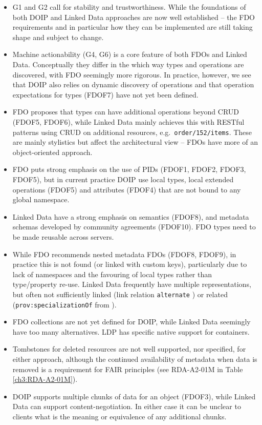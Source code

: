 \begin{itemize}
  \item
    G1 and G2 call for stability and trustworthiness. While the foundations of both DOIP and Linked Data approaches are now well established -- the FDO requirements and in particular how they can be implemented are still taking shape and subject to change.
  \item
    Machine actionability (G4, G6) is a core feature of both FDOs and Linked Data. Conceptually they differ in the which way types and operations are discovered, with FDO seemingly more rigorous. In practice, however, we see that DOIP also relies on dynamic discovery of operations and that operation expectations for types (FDOF7) have not yet been defined.
  \item
    FDO proposes that types can have additional operations beyond CRUD (FDOF5, FDOF6), while Linked Data mainly achieves this with RESTful patterns using CRUD on additional resources, e.g.~\texttt{order/152/items}. These are mainly stylistics but affect the architectural view -- FDOs have more of an object-oriented approach.
  \item
    FDO puts strong emphasis on the use of PIDs (FDOF1, FDOF2, FDOF3, FDOF5), but in current practice DOIP use local types, local extended operations (FDOF5) and attributes (FDOF4) that are not bound to any global namespace.
  \item
    Linked Data have a strong emphasis on semantics (FDOF8), and metadata schemas developed by community agreements (FDOF10). FDO types need to be made reusable across servers.
  \item
    While FDO recommends nested metadata FDOs (FDOF8, FDOF9), in practice this is not found (or linked with custom keys), particularly due to lack of namespaces and the favouring of local types rather than type/property re-use. Linked Data frequently have multiple representations, but often not sufficiently linked (link relation \texttt{alternate} \cite{rfc8288}) or related (\texttt{prov:specializationOf} from \cite{w3-prov-o}).
  \item
    FDO collections are not yet defined for DOIP, while Linked Data seemingly have too many alternatives. LDP has specific native support for containers.
  \item
    Tombstones for deleted resources are not well supported, nor specified, for either approach, although the continued availability of metadata when data is removed is a requirement for FAIR principles (see RDA-A2-01M in Table \vref{ch3:RDA-A2-01M}).
  \item
    DOIP supports multiple chunks of data for an object (FDOF3), while Linked Data can support content-negotiation. In either case it can be unclear to clients what is the meaning or equivalence of any additional chunks.
  \end{itemize}

